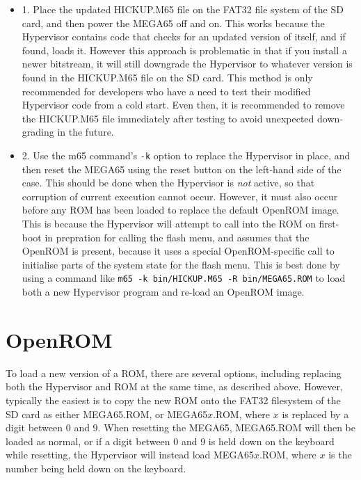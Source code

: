 \begin{itemize}
	\item 1. Place the updated HICKUP.M65 file on the FAT32 file system of the SD card, and then power the MEGA65 off and on.  This works because the Hypervisor contains code that checks for an updated version of itself, and if found, loads it. However this approach is problematic in that if you install a newer bitstream, it will still downgrade the Hypervisor to whatever version is found in the HICKUP.M65 file on the SD card.  This method is only recommended for developers who have a need to test their modified Hypervisor code from a cold start. Even then, it is recommended to remove the HICKUP.M65 file immediately after testing to avoid unexpected down-grading in the future.
	\item 2. Use the m65 command's {\tt -k} option to replace the Hypervisor in place, and then reset the MEGA65 using the reset button on the left-hand side of the case.  This should be done when the Hypervisor is {\em not} active, so that corruption of current execution cannot occur. However, it must also occur before any ROM has been loaded to replace the default OpenROM image.  This is because the Hypervisor will attempt to call into the ROM on first-boot in prepration for calling the flash menu, and assumes that the OpenROM is present, because it uses a special OpenROM-specific call to initialise parts of the system state for the flash menu.  This is best done by using a command like {\tt m65 -k bin/HICKUP.M65 -R bin/MEGA65.ROM} to load both a new Hypervisor program and re-load an OpenROM image.
\end{itemize}

\section{OpenROM}

To load a new version of a ROM, there are several options, including replacing both the Hypervisor and ROM at the same time, as described above. However, typically the easiest is to copy the new ROM onto the FAT32 filesystem of the SD card as either MEGA65.ROM, or MEGA65$x$.ROM, where $x$ is replaced by a digit between 0 and 9.  When resetting the MEGA65, MEGA65.ROM will then be loaded as normal, or if a digit between 0 and 9 is held down on the keyboard while resetting, the Hypervisor will instead load MEGA65$x$.ROM, where $x$ is the number being held down on the keyboard.
